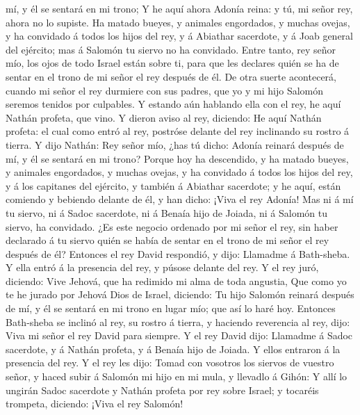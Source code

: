 mí, y él se sentará en mi trono;  Y he aquí ahora Adonía
reina: y tú, mi señor rey, ahora no lo supiste.  Ha
matado bueyes, y animales engordados, y muchas ovejas, y ha convidado á
todos los hijos del rey, y á Abiathar sacerdote, y á Joab general del
ejército; mas á Salomón tu siervo no ha convidado.  Entre
tanto, rey señor mío, los ojos de todo Israel están sobre ti, para que
les declares quién se ha de sentar en el trono de mi señor el rey
después de él.  De otra suerte acontecerá, cuando mi
señor el rey durmiere con sus padres, que yo y mi hijo Salomón seremos
tenidos por culpables.  Y estando aún hablando ella con
el rey, he aquí Nathán profeta, que vino.  Y dieron aviso
al rey, diciendo: He aquí Nathán profeta: el cual como entró al rey,
postróse delante del rey inclinando su rostro á tierra. 
Y dijo Nathán: Rey señor mío, ¿has tú dicho: Adonía reinará después de
mí, y él se sentará en mi trono?  Porque hoy ha
descendido, y ha matado bueyes, y animales engordados, y muchas ovejas,
y ha convidado á todos los hijos del rey, y á los capitanes del
ejército, y también á Abiathar sacerdote; y he aquí, están comiendo y
bebiendo delante de él, y han dicho: ¡Viva el rey Adonía!
 Mas ni á mí tu siervo, ni á Sadoc sacerdote, ni á Benaía
hijo de Joiada, ni á Salomón tu siervo, ha convidado. 
¿Es este negocio ordenado por mi señor el rey, sin haber declarado á tu
siervo quién se había de sentar en el trono de mi señor el rey después
de él?  Entonces el rey David respondió, y dijo: Llamadme
á Bath-sheba. Y ella entró á la presencia del rey, y púsose delante del
rey.  Y el rey juró, diciendo: Vive Jehová, que ha
redimido mi alma de toda angustia,  Que como yo te he
jurado por Jehová Dios de Israel, diciendo: Tu hijo Salomón reinará
después de mí, y él se sentará en mi trono en lugar mío; que así lo haré
hoy.  Entonces Bath-sheba se inclinó al rey, su rostro á
tierra, y haciendo reverencia al rey, dijo: Viva mi señor el rey David
para siempre.  Y el rey David dijo: Llamadme á Sadoc
sacerdote, y á Nathán profeta, y á Benaía hijo de Joiada. Y ellos
entraron á la presencia del rey.  Y el rey les dijo:
Tomad con vosotros los siervos de vuestro señor, y haced subir á Salomón
mi hijo en mi mula, y llevadlo á Gihón:  Y allí lo
ungirán Sadoc sacerdote y Nathán profeta por rey sobre Israel; y
tocaréis trompeta, diciendo: ¡Viva el rey Salomón! 

